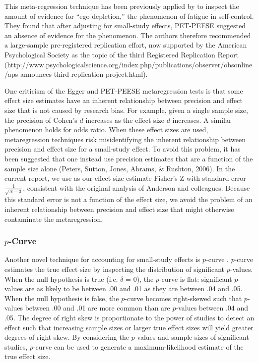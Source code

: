\documentclass[man]{apa6}
\begin{document}
This meta-regression technique has been previously applied by \citet{Carter:McCullough:2014} to inspect the amount of evidence for ``ego depletion,'' the phenomenon of fatigue in self-control. They found that after adjusting for small-study effects, PET-PEESE suggested an absence of evidence for the phenomenon. The authors therefore recommended a large-sample pre-registered replication effort, now supported by the American Psychological Society as the topic of the third Registered Replication Report (http://www.psychologicalscience.org/index.php/publications/observer/obsonline/aps-announces-third-replication-project.html).

One criticism of the Egger and PET-PEESE metaregression tests is that some effect size estimates have an inherent relationship between precision and effect size that is not caused by research bias. For example, given a single sample size, the precision of Cohen's $d$ increases as the effect size $d$ increases. A similar phenomenon holds for odds ratio. When these effect sizes are used, metaregression techniques risk misidentifying the inherent relationship between precision and effect size for a small-study effect. To avoid this problem, it has been suggested that one instead use precision estimates that are a function of the sample size alone (Peters, Sutton, Jones, Abrams, \& Rushton, 2006). In the current report, we use as our effect size estimate Fisher's Z with standard error $\frac{1}{\sqrt{N-3}}$, consistent with the original analysis of Anderson and colleagues. Because this standard error is not a function of the effect size, we avoid the problem of an inherent relationship between precision and effect size that might otherwise contaminate the metaregression.

\subsubsection{$p$-Curve}
Another novel technique for accounting for small-study effects is $p$-curve \citep{Simonsohn:etal:2014}. $p$-curve estimates the true effect size by inspecting the distribution of significant $p$-values. When the null hypothesis is true (i.e. $\delta$ = 0), the $p$-curve is flat: significant $p$-values are as likely to be between .00 and .01 as they are between .04 and .05. When the null hypothesis is false, the $p$-curve becomes right-skewed such that $p$-values between .00 and .01 are more common than are $p$-values between .04 and .05. The degree of right skew is proportionate to the power of studies to detect an effect such that increasing sample sizes or larger true effect sizes will yield greater degrees of right skew. By considering the $p$-values and sample sizes of significant studies, $p$-curve can be used to generate a maximum-likelihood estimate of the true effect size.
\end{document}
